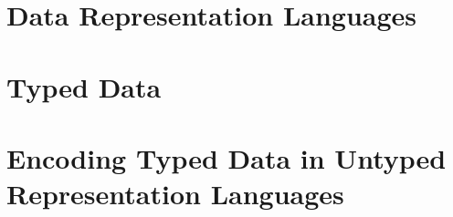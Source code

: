 \section{Data Representation Languages}

\section{Typed Data}

\section{Encoding Typed Data in Untyped Representation Languages}